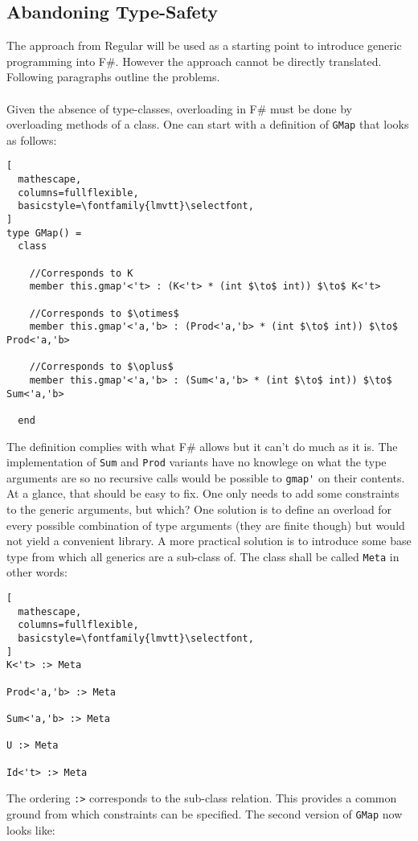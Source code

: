 \documentclass[8pt]{extarticle}
\begin{document}
\subsection{Abandoning Type-Safety}
The approach from Regular will be used as a starting point to introduce generic programming into F\#. However the approach cannot be directly translated. Following paragraphs outline the problems.
\\\\Given the absence of type-classes, overloading in F\# must be done by overloading methods of a class. One can start with a definition of \verb+GMap+ that looks as follows:
\begin{lstlisting}[
  mathescape,
  columns=fullflexible,
  basicstyle=\fontfamily{lmvtt}\selectfont,
]
type GMap() =
  class

    //Corresponds to K
    member this.gmap'<'t> : (K<'t> * (int $\to$ int)) $\to$ K<'t>
    
    //Corresponds to $\otimes$
    member this.gmap'<'a,'b> : (Prod<'a,'b> * (int $\to$ int)) $\to$ Prod<'a,'b>

    //Corresponds to $\oplus$
    member this.gmap'<'a,'b> : (Sum<'a,'b> * (int $\to$ int)) $\to$ Sum<'a,'b>

  end
\end{lstlisting}
The definition complies with what F\# allows but it can't do much as it is. The implementation of \verb+Sum+ and \verb+Prod+ variants have no knowlege on what the type arguments are so no recursive calls would be possible to \verb+gmap'+ on their contents. At a glance, that should be easy to fix. One only needs to add some constraints to the generic arguments, but which? One solution is to define an overload for every possible combination of type arguments (they are finite though) but would not yield a convenient library. A more practical solution is to introduce some base type from which all generics are a sub-class of. The class shall be called \verb+Meta+ in other words:
\begin{lstlisting}[
  mathescape,
  columns=fullflexible,
  basicstyle=\fontfamily{lmvtt}\selectfont,
]
K<'t> :> Meta

Prod<'a,'b> :> Meta

Sum<'a,'b> :> Meta

U :> Meta

Id<'t> :> Meta
\end{lstlisting}
The ordering \verb+:>+ corresponds to the sub-class relation. This provides a common ground from which constraints can be specified. The second version of \verb+GMap+ now looks like:
\end{document}
